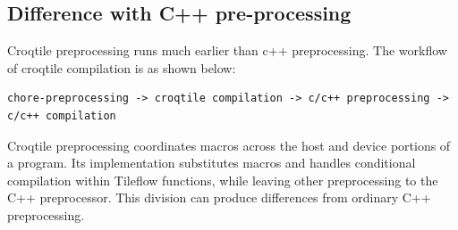 \subsection*{Difference with C++ pre-processing}

Croqtile preprocessing runs much earlier than c++ preprocessing. The workflow of croqtile compilation is as shown below:

\begin{lstlisting}[language=croqtile,caption={Differences from C++ Preprocessing}]
chore-preprocessing -> croqtile compilation -> c/c++ preprocessing -> c/c++ compilation
\end{lstlisting}

Croqtile preprocessing coordinates macros across the host and device portions of a program. Its implementation substitutes macros and handles conditional compilation within Tileflow functions, while leaving other preprocessing to the C++ preprocessor. This division can produce differences from ordinary C++ preprocessing.
